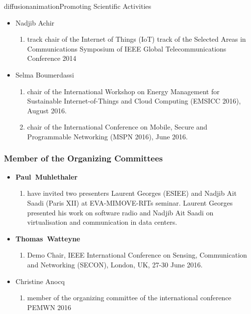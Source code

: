 \documentclass{ra2016}
\newcommand{\paul}             {\textbf{Paul~Muhlethaler}}
\newcommand{\thomas}           {\textbf{Thomas~Watteyne}}
\begin{document}
\begin{module}{diffusion}{animation}{Promoting Scientific Activities}
\begin{itemize}
\begin{enumerate}
        \end{enumerate}
    \item Nadjib Achir
        \begin{enumerate}
            \item track chair of the Internet of Things (IoT) track of the Selected Areas in Communications Symposium of IEEE Global Telecommunications Conference 2014
        \end{enumerate}
    \item Selma Boumerdassi
        \begin{enumerate}
         \item chair of the International Workshop on Energy Management for Sustainable Internet-of-Things and Cloud Computing (EMSICC 2016), August 2016.
         \item chair of the International Conference on Mobile, Secure and Programmable Networking (MSPN 2016), June 2016.
        \end{enumerate}
\end{itemize}

    
    \subsubsection{Member of the Organizing Committees}
    \begin{itemize}
    \item \paul
        \begin{enumerate}
            \item have invited two presenters Laurent Georges (ESIEE)  and Nadjib Ait Saadi (Paris XII) at EVA-MIMOVE-RITs seminar. Laurent Georges presented his work on software radio and  Nadjib Ait Saadi on virtualisation and communication in data centers. 
        \end{enumerate}
    \item \thomas
        \begin{enumerate}
            \item Demo Chair, IEEE International Conference on Sensing, Communication and Networking (SECON), London, UK, 27-30 June 2016.
        \end{enumerate}
    \item Christine Anocq
        \begin{enumerate}
            \item member of the organizing committee of the international conference PEMWN 2016
        \end{enumerate}
\end{itemize}


\end{module}
\end{document}
